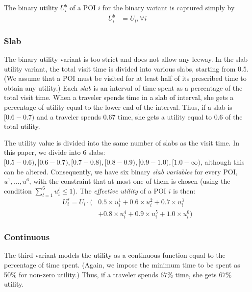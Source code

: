 The binary utility $U^b_i$ of a POI $i$ for the binary variant is captured
simply by
%
\begin{align}
	\label{eq:binary}
	U^b_i & = U_i, \forall i
\end{align}

\subsubsection{\textbf{Slab}}
\label{sec:slab}

The binary utility variant is too strict and does not allow any leeway.
In the slab utility variant, the total visit time is divided into various slabs, starting from
0.5.  (We assume that a POI must be visited for at least half of its prescribed time
to obtain any utility.) Each \emph{slab} is an interval of time spent as a percentage
of the total visit time.  When a traveler spends time in a slab of
interval, she gets a percentage of utility equal to the lower end of the
interval.  Thus, if a slab is $[0.6-0.7)$ and a traveler spends $0.67$ time,
she gets a utility equal to $0.6$ of the total utility.

The utility value is divided into the same number of slabs as the visit
time.  In this paper, we divide into 6 slabs: $[0.5-0.6), [0.6-0.7), [0.7-0.8),
[0.8-0.9), [0.9-1.0), [1.0-\infty)$, although this can be altered.
Consequently, we have six binary \emph{slab variables} for every POI,
$u^1, \dots, u^6$, with the constraint that at most one of them is chosen
(using the condition $\sum_{l=1}^6 u^l_i \leq 1$).  The \emph{effective
utility} of a POI $i$ is then:
%
\begin{align}
	\label{eq:slab}
	U^s_i = U_i \cdot ( & 0.5 \times u^1_i + 0.6 \times u^2_i + 0.7 \times u^3_i \nonumber \\
		& + 0.8 \times u^4_i + 0.9 \times u^5_i + 1.0 \times u^6_i )
\end{align}

\subsubsection{\textbf{Continuous}}
\label{sec:continuous}

The third variant models the utility as a continuous function equal to the
percentage of time spent.  (Again, we impose the minimum time to be spent
as 50\% for non-zero utility.) Thus, if a traveler spends 67\% time, she
gets 67\% utility.

